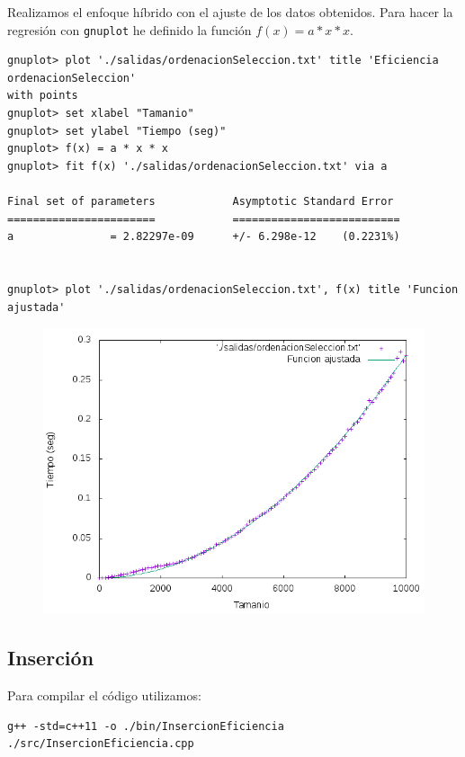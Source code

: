 \documentclass[11pt]{article}
\begin{document}
Realizamos el enfoque híbrido con el ajuste de los datos obtenidos. Para hacer la regresión con \texttt{gnuplot} he definido la función $f(x) = a * x * x$.

\begin{verbatim}
gnuplot> plot './salidas/ordenacionSeleccion.txt' title 'Eficiencia ordenacionSeleccion' 
with points
gnuplot> set xlabel "Tamanio"
gnuplot> set ylabel "Tiempo (seg)"
gnuplot> f(x) = a * x * x
gnuplot> fit f(x) './salidas/ordenacionSeleccion.txt' via a

Final set of parameters            Asymptotic Standard Error
=======================            ==========================
a               = 2.82297e-09      +/- 6.298e-12    (0.2231%)


gnuplot> plot './salidas/ordenacionSeleccion.txt', f(x) title 'Funcion ajustada'
\end{verbatim}

\begin{figure}[H]
\begin{center}
\includegraphics[width=12cm]{../salidas/ordenacionSeleccion.png}
\end{center}
\end{figure}


\subsection{Inserción}

Para compilar el código utilizamos:
\begin{verbatim}
g++ -std=c++11 -o ./bin/InsercionEficiencia ./src/InsercionEficiencia.cpp 
\end{verbatim}
\end{document}
